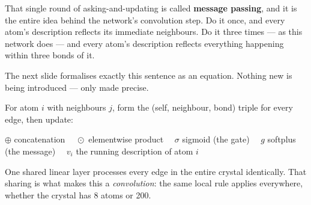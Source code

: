 \documentclass[aspectratio=169]{beamer}
\begin{document}
\begin{frame}

\vspace{3pt}

\vspace{8pt}
{\sffamily\small
That single round of asking-and-updating is called \textbf{message
passing}, and it is the entire idea behind the network's convolution step.
Do it once, and every atom's description reflects its immediate neighbours.
Do it three times --- as this network does --- and every atom's
description reflects everything happening within three bonds of it.}

\vspace{5pt}
{\sffamily\small\color{Muted}
The next slide formalises exactly this sentence as an equation. Nothing
new is being introduced --- only made precise.}

\end{frame}

\begin{frame}

{\sffamily\small For atom $i$ with neighbours $j$, form the (self,
neighbour, bond) triple for every edge, then update:}

\vspace{4pt}

\vspace{5pt}
{\sffamily\footnotesize\color{Muted}
$\oplus$ concatenation $\quad\odot$ elementwise product $\quad\sigma$
sigmoid (the gate) $\quad g$ softplus (the message) $\quad v_i$ the running
description of atom $i$}

\vspace{5pt}
{\sffamily\small
One shared linear layer processes every edge in the entire crystal
identically. That sharing is what makes this a \emph{convolution}: the same
local rule applies everywhere, whether the crystal has 8 atoms or 200.}

\end{frame}
\end{document}

